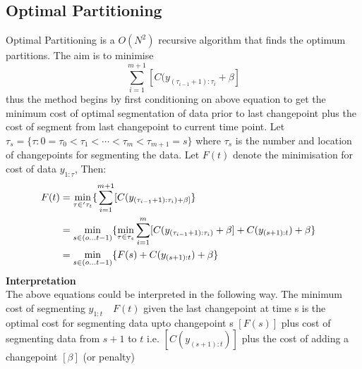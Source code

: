 \documentclass{article}
\begin{document}
\subsection{Optimal Partitioning}
Optimal Partitioning is a $O(N^{2})$ recursive algorithm that finds the optimum partitions. The aim is to minimise 
\begin{equation}
    \sum_{i = 1}^{m+1} [C(y_{(\tau_{i-1}+1) : \tau_{i}} + \beta]    
\end{equation}
thus the method begins by first conditioning on above equation to get the minimum cost of optimal segmentation of data prior to last changepoint plus the cost of segment from last changepoint to current time point. Let $\tau_{s} = \{\tau: 0 = \tau_{0} < \tau_{1}< \cdots < \tau_{m}<\tau_{m+1} = s \}$ where $\tau_{s}$ is the number and location of changepoints for segmenting the data. Let $F(t)$ denote the minimisation for cost of data $y_{1:\tau}$, Then:
\begin{equation*}
    \begin{split}
        F(t)  &  =    \min_{\tau \in '\tau_{t}}\{ \sum_{i=1}^{m+1} [C(y_{(\tau_{i-1}+1) :\tau_{i}) + \beta] }\}
    \cr        & =   \min_{s\in (o...t-1)} \{\min_{\tau \in \tau_{s}} \sum_{i=1}^{m} [C(y_{(\tau_{i-1}+1) :\tau_{i})} + \beta] + C(y_{(s+1):t}) +\beta\}
    \cr         & =  \min_{s\in (o...t-1)} \{F(s) + C(y_{(s+1):t}) +\beta\}
    \end{split}
\end{equation*}
\textbf{Interpretation}\\
The above equations could be interpreted in the following way. The minimum cost of segmenting $y_{1:t} \quad F(t)$ given the last changepoint at time s is the optimal cost for segmenting data upto changepoint s $[F(s)]$ plus cost of segmenting data from $s+1$ to $t$ i.e. $[C(y_{(s+1):t})]$ plus the cost of adding a changepoint $[\beta]$ (or penalty)\\
\end{document}
